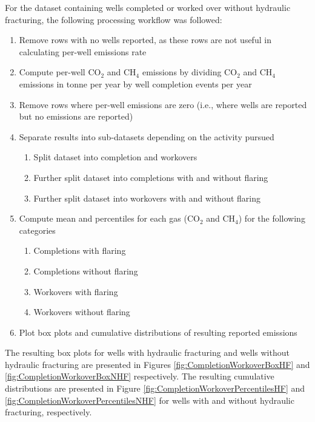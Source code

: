 \documentclass[11pt]{report}
\begin{document}
{{{{For the dataset containing wells completed or worked over without hydraulic fracturing, the following processing workflow was followed:
\begin{enumerate}
\item Remove rows with no wells reported, as these rows are not useful in calculating per-well emissions rate	
\item Compute per-well CO$_2$ and CH$_4$ emissions by dividing CO$_2$ and CH$_4$ emissions in tonne per year by well completion events per year	
\item Remove rows where per-well emissions are zero (i.e., where wells are reported but no emissions are reported)	
\item Separate results into sub-datasets depending on the activity pursued	
	\begin{enumerate}
	\item Split dataset into completion and workovers
	\item Further split dataset into completions with and without flaring
	\item Further split dataset into workovers with and without flaring
	\end{enumerate}
\item Compute mean and percentiles for each gas (CO$_2$ and CH$_4$) for the following categories	
	\begin{enumerate}
	\item Completions with flaring
	\item Completions without flaring
	\item Workovers with flaring
	\item Workovers without flaring
	\end{enumerate}
\item Plot box plots and cumulative distributions of resulting reported emissions
\end{enumerate}


The resulting box plots for wells with hydraulic fracturing and wells without hydraulic fracturing are presented in Figures \ref{fig:CompletionWorkoverBoxHF} and \ref{fig:CompletionWorkoverBoxNHF} respectively. The resulting cumulative distributions are presented in Figure \ref{fig:CompletionWorkoverPercentilesHF} and \ref{fig:CompletionWorkoverPercentilesNHF} for wells with  and without hydraulic fracturing, respectively.




}}}}
\end{document}
